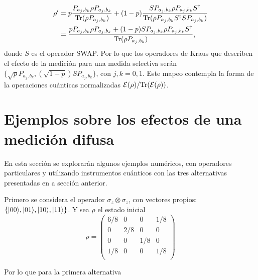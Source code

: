     \begin{equation}
       \begin{split}
           \rho'&= p\dfrac{ P_{a_j,b_k}\rho P_{a_j,b_k}}{{\rm Tr}(\rho P_{a_j,b_k})}+ (1-p)\dfrac{S P_{a_j,b_k}\rho P_{a_j,b_k}S^\dagger}{{\rm Tr}(\rho P_{a_j,b_k} S^\dagger SP_{a_j,b_k})}\\
           &=\dfrac{p P_{a_j,b_k}\rho P_{a_j,b_k}+(1-p) S P_{a_j,b_k}\rho P_{a_j,b_k}S^\dagger}{{\rm Tr}(\rho P_{a_j,b_k})},
       \end{split}
    \end{equation}
    donde $S$ es el operador SWAP\@. Por lo que los operadores de Kraus que describen el efecto de la medición para una medida selectiva serán $\{\sqrt{p}P_{a_j,b_k}, (\sqrt{1-p})S P_{a_j,b_k}\}$, con $j,k=0,1$. Este mapeo contempla la forma de la operaciones cuánticas normalizadas $\mathcal{E}(\rho)/{\rm Tr}(\mathcal{E}(\rho))$. %

    



\section{Ejemplos sobre los efectos de una medición difusa}

En esta sección se explorarán algunos ejemplos numéricos, con operadores particulares y utilizando instrumentos cuánticos con las tres alternativas presentadas en a sección anterior.

Primero se considera el operador $\sigma_z \otimes \sigma_z$, con vectores propios: $\{|00\rangle, |01\rangle, |10\rangle, |11\rangle\}$. Y sea $\rho $ el estado inicial
\[\rho={\begin{pmatrix}6/8&0&0 &1/8\\0&2/8&0 &0\\0 &0 &1/8 &0 \\1/8&0&0&1/8\\\end{pmatrix}}\]


Por lo que  para la primera alternativa 

